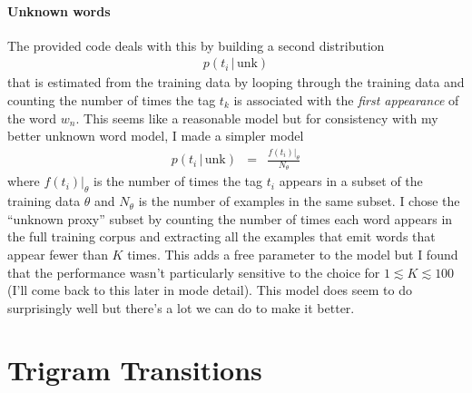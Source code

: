 \documentclass[11pt]{article}
\begin{document}
\paragraph{Unknown words}
The provided code deals with this by building a second distribution
\begin{eqnarray}
p(t_i\,|\,\mathrm{unk})
\end{eqnarray}
that is estimated from the training data by looping through the training data
and counting the number of times the tag $t_k$ is associated with the
\emph{first appearance} of the word $w_n$.
This seems like a reasonable model but for consistency with my better unknown
word model, I made a simpler model
\begin{eqnarray}
p(t_i\,|\,\mathrm{unk}) &=& \frac{\left . f(t_i)\right |_\theta}{N_\theta}
\end{eqnarray}
where $\left.f(t_i)\right|_\theta$ is the number of times the tag $t_i$
appears in a subset of the training data $\theta$ and $N_\theta$ is the number
of examples in the same subset.
I chose the ``unknown proxy'' subset by counting the number of times each word
appears in the full training corpus and extracting all the examples that emit
words that appear fewer than $K$ times.
This adds a free parameter to the model but I found that the performance
wasn't particularly sensitive to the choice for $1 \lesssim K \lesssim 100$
(I'll come back to this later in mode detail).
This model does seem to do surprisingly well but there's a lot we can do to
make it better.

\section{Trigram Transitions}
\end{document}
